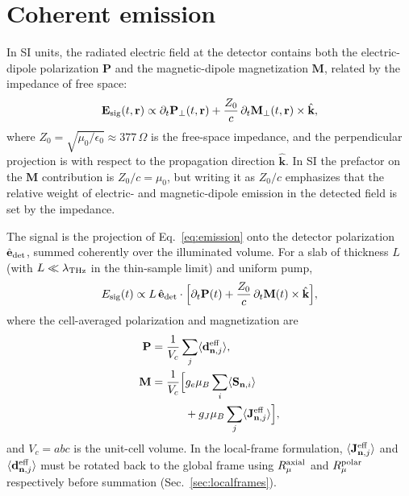 \documentclass[reprint,amsmath,amssymb,aps,prb,longbibliography]{revtex4-2}
\newcommand{\fix}[1]{#1}
\newcommand{\Jeff}{\mathbf{J}^{\rm eff}}
\newcommand{\deff}{\mathbf{d}^{\rm eff}}
\newcommand{\bfS}{\mathbf{S}}
\begin{document}
\section{Coherent emission}
\label{sec:emission}

\fix{In SI units, the radiated electric field at the detector contains
both the electric-dipole polarization $\mathbf P$ and the magnetic-dipole
magnetization $\mathbf M$, related by the impedance of free space:}
\begin{equation}
\mathbf E_{\rm sig}(t,\mathbf r) \propto
\partial_t\mathbf P_\perp(t,\mathbf r) + \frac{Z_0}{c}\,\partial_t\mathbf M_\perp(t,\mathbf r)\times\hat{\mathbf k},
\label{eq:emission}
\end{equation}
where $Z_0 = \sqrt{\mu_0/\epsilon_0}\approx 377\,\Omega$ is the
free-space impedance, and the perpendicular projection is with respect to
the propagation direction $\hat{\mathbf k}$. In SI the prefactor on the
$\mathbf M$ contribution is $Z_0/c = \mu_0$, but writing it as $Z_0/c$
emphasizes that the relative weight of electric- and magnetic-dipole
emission in the detected field is set by the impedance.

The signal is the projection of Eq.~\eqref{eq:emission} onto the detector
polarization $\hat{\mathbf e}_{\rm det}$, summed coherently over the
illuminated volume. For a slab of thickness $L$ (with $L\ll\lambda_{\rm THz}$
in the thin-sample limit) and uniform pump,
\begin{equation}
E_{\rm sig}(t)\propto L\,\hat{\mathbf e}_{\rm det}\cdot\Bigl[
\partial_t\mathbf P(t) + \frac{Z_0}{c}\,\partial_t\mathbf M(t)\times\hat{\mathbf k}
\Bigr],
\label{eq:emissionslab}
\end{equation}
where the cell-averaged polarization and magnetization are
\begin{equation}
\begin{aligned}
\mathbf P &= \frac{1}{V_c}\sum_j \langle\deff_{\mathbf n,j}\rangle,\\
\mathbf M &= \frac{1}{V_c}\Bigl[g_e\mu_B\sum_i\langle\bfS_{\mathbf n,i}\rangle\\
&\qquad\quad{} + g_J\mu_B\sum_j\langle\Jeff_{\mathbf n,j}\rangle\Bigr],
\end{aligned}
\label{eq:PMcell}
\end{equation}
and $V_c = abc$ is the unit-cell volume. \fix{In the local-frame
formulation, $\langle\Jeff_{\mathbf n,j}\rangle$ and
$\langle\deff_{\mathbf n,j}\rangle$ must be rotated back to the global
frame using $R_\mu^{\rm axial}$ and $R_\mu^{\rm polar}$ respectively
before summation} (Sec.~\ref{sec:localframes}).
\end{document}
